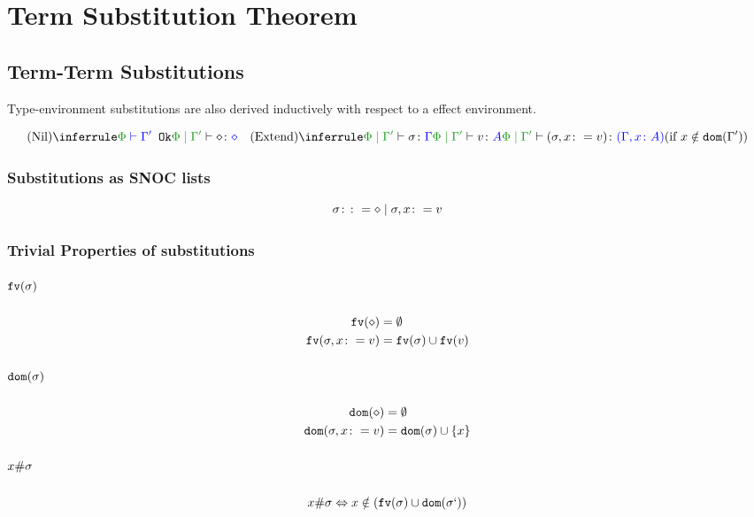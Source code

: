 \documentclass{report}
\begin{document}
\chapter{Term Substitution Theorem}

\section{Term-Term Substitutions}
Type-environment substitutions are also derived inductively with respect to a effect environment.


\[
    \ntreeruleI{Nil}{\wellformedok{\P}{\G'}}{\etyperelation{\P}{\G'}{\nil}{\nil}}
    \quad
    \condtreeruleII{Extend}{
        \etyperelation{\P}{\G'}{\si}{\G}
    }{
        \etyperelation{\P}{\G'}{v}{A}
    }{
        \etyperelation{\P}{\G'}{(\si, x \setto v)}{(\gax)}
    }{x \notin \dom{\G'}}
\]




\subsection{Substitutions as SNOC lists}

\begin{equation}
   \sigma \colon\colon= \diamond \mid \sigma, x \colon= v
\end{equation}

\subsection{Trivial Properties of substitutions}
\paragraph{$\texttt{fv}(\sigma)$}
\begin{align*}
    \texttt{fv}(\diamond) &= \emptyset\\
    \texttt{fv}(\sigma, x\colon= v) &= \texttt{fv}(\sigma)\cup\texttt{fv}(v)
\end{align*}
\paragraph{$\texttt{dom}(\sigma)$}
\begin{align*}
    \texttt{dom}(\diamond) & = \emptyset\\
    \texttt{dom}(\sigma, x\colon= v) & = \texttt{dom}(\sigma)\cup\left\{x\right\}
\end{align*}

\paragraph{$x \# \sigma$}
\begin{equation}
    x \# \sigma \Leftrightarrow x\notin(\texttt{fv}(\sigma)\cup\texttt{dom}(\sigma`))
\end{equation}
\end{document}
